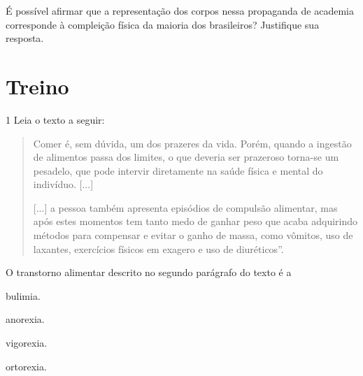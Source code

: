 É possível afirmar que a representação dos corpos nessa propaganda de 
academia corresponde à compleição física da maioria dos brasileiros?
Justifique sua resposta.



\section*{Treino}

\num{1} Leia o texto a seguir:
\enlargethispage{\baselineskip}

\begin{quote}
Comer é, sem dúvida, um dos prazeres da vida. Porém, quando a ingestão
de alimentos passa dos limites, o que deveria ser prazeroso torna-se um
pesadelo, que pode intervir diretamente na saúde física e mental do
indivíduo. {[}...{]}

{[}...{]} a pessoa também apresenta episódios de compulsão alimentar,
mas após estes momentos tem tanto medo de ganhar peso que acaba
adquirindo métodos para compensar e evitar o ganho de massa, como
vômitos, uso de laxantes, exercícios físicos em exagero e uso de
diuréticos''.

\end{quote}

O transtorno alimentar descrito no segundo parágrafo do texto é a

\begin{escolha}
\item bulimia.

\item anorexia.

\item vigorexia.

\item ortorexia.
\end{escolha}



